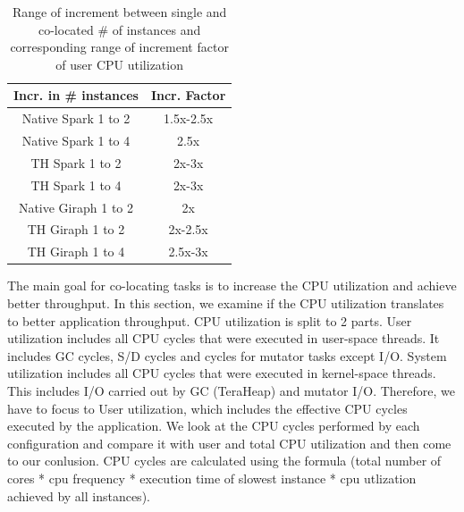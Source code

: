 \begin{table}[thbp]
  \centering
  \caption{Range of increment between single and co-located \# of instances and corresponding range of increment factor of user CPU utilization}
  \label{tab:user_factors}
  \begin{tabular}{|c|c|}
    \hline
    \textbf{Incr. in # instances} & \textbf{Incr. Factor} \\
    \hline
    Native Spark 1 to 2  & 1.5x-2.5x \\
    Native Spark 1 to 4 & 2.5x \\
    TH Spark 1 to 2 & 2x-3x \\
    TH Spark 1 to 4 & 2x-3x \\
    Native Giraph 1 to 2 & 2x \\
    TH Giraph 1 to 2 & 2x-2.5x \\
    TH Giraph 1 to 4 & 2.5x-3x \\
    \hline
  \end{tabular}
\end{table}
\fi

The main goal for co-locating tasks is to increase the CPU utilization and achieve better
throughput. In this section, we examine if the CPU utilization translates to better application throughput.
CPU utilization is split to 2 parts. 
User utilization includes all CPU cycles that were executed in user-space threads.
It includes GC cycles, S/D cycles and cycles for mutator tasks except I/O.
System utilization includes all CPU cycles that were executed in kernel-space threads.
This includes I/O carried out by GC (TeraHeap) and mutator I/O.
Therefore, we have to focus to User utilization, which includes the effective CPU cycles executed by the application.
We look at the CPU cycles performed by each configuration and compare it with user and total CPU utilization and then come to our conlusion.
CPU cycles are calculated using the formula (total number of cores * cpu frequency * execution time of slowest instance * cpu utlization achieved by all instances).

